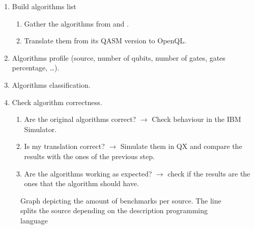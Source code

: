 \begin{enumerate}
\item Build algorithms list       
\begin{enumerate}
\item Gather the algorithms from \cite{zulehner17:effic_method_mappin_quant_circuit} and \cite{Lin_2014}.
\item Translate them from its QASM version to OpenQL.
\end{enumerate}
\item Algorithms profile (source, number of qubits, number of gates, gates percentage, \ldots{}).
\item Algorithms classification.
\item Check algorithm correctness.
\begin{enumerate}
\item Are the original algorithms correct? \(\to\) Check behaviour in the IBM Simulator.
\item Is my translation correct? \(\to\) Simulate them in QX and compare the results with the ones of the previous step.
\item Are the algorithms working as expected? \(\to\) check if the results are the ones that the algorithm should have.
\end{enumerate}
\end{enumerate}

\begin{figure}
\centering
{}
\label{fig:benchmarks_graph}
\caption{Graph depicting the amount of benchmarks per source. The line splits the source depending on the description programming language}
\end{figure}

